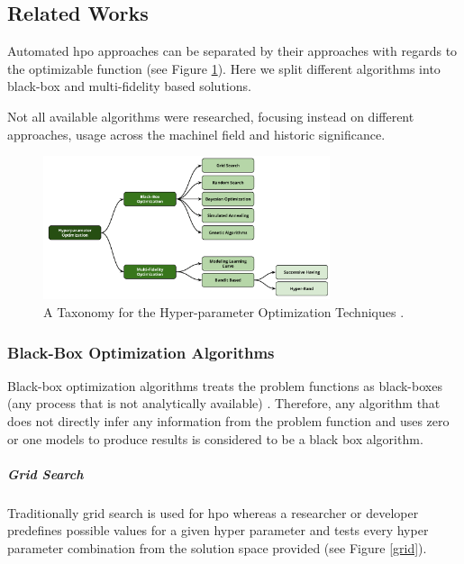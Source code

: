 
\subsection{Related Works}

Automated \acrshort{hpo} approaches can be separated by their approaches with regards to the optimizable function (see Figure \ref{fig:state_of_art_taxonomy}). Here we split different algorithms into black-box and multi-fidelity based solutions.

Not all available algorithms were researched, focusing instead on different approaches, usage across the \acrshort{machinel} field and historic significance.

\begin{figure}[ht]
	\centering
	\includegraphics[width=0.75\textwidth]{images/state_art-taxonomy_optimizers.png}
	\caption{A Taxonomy for the Hyper-parameter Optimization Techniques \parencite{elshawi2019automated}.}
	\label{fig:state_of_art_taxonomy}
\end{figure}

\subsubsection{Black-Box Optimization Algorithms}

Black-box optimization algorithms treats the problem functions as black-boxes (any process that is not analytically available) \parencite[ch.~1]{book}. Therefore, any algorithm that does not directly infer any information from the problem function and uses zero or one models to produce results is considered to be a black box algorithm.

\subparagraph{Grid Search}
Traditionally grid search is used for \acrshort{hpo} \parencite{liashchynskyi2019grid} whereas a researcher or developer predefines possible values for a given hyper parameter and tests every hyper parameter combination from the solution space provided (see Figure \ref{grid}).

